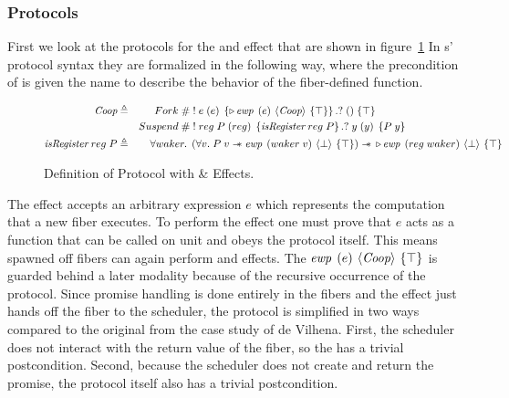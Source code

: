\subsubsection{Protocols}
\label{sec:sched-spec-protocols}

First we look at the protocols for the \efork{} and \esuspend{} effect that are shown in figure~\ref{fig:coop-protocol-simpl}
In \hazel{}s' protocol syntax they are formalized in the following way, where the precondition of \esuspend{} is given the name \gsIsReg{} to describe the behavior of the fiber-defined  function.

\begin{figure}[ht]
  \begin{alignat*}{2}
    \proto{}             & \triangleq & \quad Fork\; \#  & \; !\; e\; (e)\; \left\{\later \ewp{e}{\proto{}}{\top}\right\}. ?\; ()\; \{ \top \}                                 \\
                         &            & Suspend\;    \#  & \; !\; reg\; P\; (reg)\; \left\{\gsIsReg{}\; reg\; P\right\}.?\; y\; (y)\; \left\{ P\; y \right\}                   \\
    \gsIsReg{}\; reg\; P & \triangleq & \forall waker.\; & \left( \forall v.\;  P\; v \wand{} \ewp{waker\; v}{\bot}{\top} \right) \wand{} \later \ewp{reg\; waker}{\bot}{\top}
  \end{alignat*}
  \caption{Definition of \proto{} Protocol with \efork{} \& \esuspend{} Effects.}
  \label{fig:coop-protocol-simpl}
\end{figure}

The \efork{} effect accepts an arbitrary expression \(e\) which represents the computation that a new fiber executes.
To perform the effect one must prove that \(e\) acts as a function that can be called on unit and obeys the \proto{} protocol itself.
This means spawned off fibers can again perform \efork{} and \esuspend{} effects.
The \(\ewp{e}{\proto{}}{\top}\) is guarded behind a later modality because of the recursive occurrence of the \proto{} protocol.
Since promise handling is done entirely in the fibers and the \efork{} effect just hands off the fiber to the scheduler, the protocol is simplified in two ways compared to the original from the case study of de Vilhena.
First, the scheduler does not interact with the return value of the fiber, so the \ewpt{} has a trivial postcondition.
Second, because the scheduler does not create and return the promise, the protocol itself also has a trivial postcondition.

